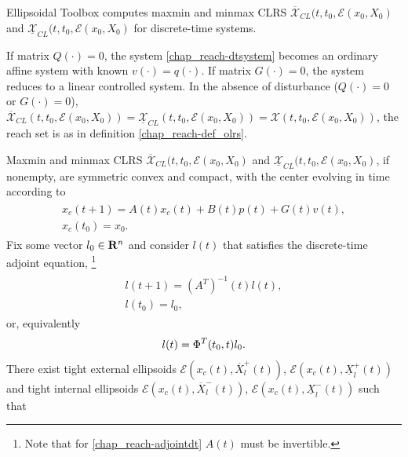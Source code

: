 \documentclass[letterpaper,10pt,english]{sphinxmanual}
\begin{document}
Ellipsoidal Toolbox computes maxmin and minmax CLRS
\(\overline{{\mathcal X}}_{CL}(t, t_0, {\mathcal E}(x_0, X_0)\) and
\(\underline{{\mathcal X}}_{CL}(t, t_0, {\mathcal E}(x_0, X_0)\) for
discrete-time systems.

If matrix \(Q(\cdot)=0\), the system \eqref{chap_reach-dtsystem} becomes an
ordinary affine system with known \(v(\cdot)=q(\cdot)\). If matrix
\(G(\cdot)=0\), the system reduces to a linear controlled system. In
the absence of disturbance (\(Q(\cdot)=0\) or \(G(\cdot)=0\)),
\(\overline{{\mathcal X}}_{CL}(t,t_0,{\mathcal E}(x_0,X_0))=\underline{{\mathcal X}}_{CL}(t,t_0,{\mathcal E}(x_0,X_0))={\mathcal X}(t,t_0,{\mathcal E}(x_0,X_0))\),
the reach set is as in definition \eqref{chap_reach-def_olrs}.

Maxmin and minmax CLRS
\(\overline{{\mathcal X}}_{CL}(t, t_0, {\mathcal E}(x_0, X_0)\) and
\(\underline{{\mathcal X}}_{CL}(t, t_0, {\mathcal E}(x_0, X_0)\), if
nonempty, are symmetric convex and compact, with the center evolving in
time according to
\label{chap_reach:equation-fwdcenterd}\begin{gather}
\begin{split}x_c(t+1) = A(t)x_c(t) + B(t)p(t) + G(t)v(t), \\
x_c(t_0)= x_0.\end{split}\label{chap_reach-fwdcenterd}
\end{gather}
Fix some vector \(l_0\in{\bf R}^n\) and consider \(l(t)\) that
satisfies the discrete-time adjoint equation, \footnote{
Note that for \eqref{chap_reach-adjointdt} \(A(t)\) must be invertible.
}
\label{chap_reach:equation-adjointdt}\begin{gather}
\begin{split}l(t+1) = \left(A^T\right)^{-1}(t)l(t), \\
l(t_0) = l_0,\end{split}\label{chap_reach-adjointdt}
\end{gather}
or, equivalently
\begin{gather}
\begin{split}l(t) = \Phi^T(t_0, t)l_0 .\end{split}\notag
\end{gather}
There exist tight external ellipsoids
\({\mathcal E}(x_c(t), \overline{X}^+_l(t))\),
\({\mathcal E}(x_c(t), \underline{X}^+_l(t))\) and tight internal
ellipsoids \({\mathcal E}(x_c(t), \overline{X}^-_l(t))\),
\({\mathcal E}(x_c(t), \underline{X}^-_l(t))\) such that
\end{document}
